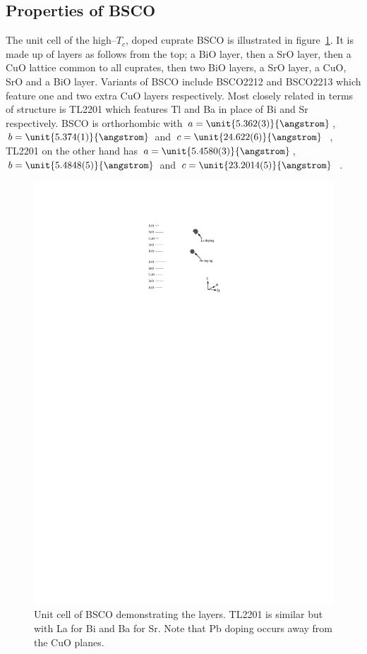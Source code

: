 
\subsection{Properties of \acs{BSCO}}
\label{Sec:Intro:PropertiesBSCO}

The unit cell of the high--$T_c$, doped cuprate \acf{BSCO} is illustrated in figure~\ref{Fig:Intro:BSCOUnitCell}. It is made up of layers as follows from the top; a BiO layer, then a SrO layer, then a CuO lattice common to all cuprates, then two BiO layers, a SrO layer, a CuO, SrO and a BiO layer. Variants of \acs{BSCO} include \ac{BSCO2212} and \ac{BSCO2213} which feature one and two extra CuO layers respectively. Most closely related in terms of structure is \acs{TL2201} which features Tl and Ba in place of Bi and Sr respectively. \ac{BSCO} is orthorhombic with $a=\unit{5.362(3)}{\angstrom}$, $b=\unit{5.374(1)}{\angstrom}$ and $c=\unit{24.622(6)}{\angstrom}$~\cite{Torardi1988}, \ac{TL2201} on the other hand has $a=\unit{5.4580(3)}{\angstrom}$, $b=\unit{5.4848(5)}{\angstrom}$ and $c=\unit{23.2014(5)}{\angstrom}$~\cite{Peets2007}.
\begin{figure}[htbp]
    \begin{center}
        \includegraphics[scale=1.1]{Chapter-Introduction/Figures/BSCOUnitCell/BSCOUnitCell}
        \caption{Unit cell of \acs{BSCO} demonstrating the layers. \ac{TL2201} is similar but with La for Bi and Ba for Sr. Note that Pb doping occurs away from the CuO planes.}
        \label{Fig:Intro:BSCOUnitCell}
    \end{center}
\end{figure}
